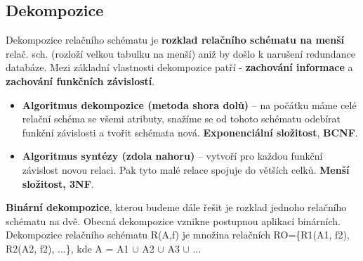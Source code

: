 \subsection{Dekompozice}
Dekompozice relačního schématu je \textbf{rozklad relačního schématu na menší} relač. sch. (rozloží velkou tabulku na menší) aniž by došlo k narušení redundance databáze. Mezi základní vlastnosti dekompozice patří - \textbf{zachování informace} a \textbf{zachování funkčních závislostí}.
\begin{itemize}
\item \textbf{Algoritmus dekompozice (metoda shora dolů)} -- na počátku máme celé relační schéma se všemi atributy, snažíme se od tohoto schématu odebírat funkční závislosti a tvořit schémata nová. \textbf{Exponenciální složitost}, \textbf{BCNF}.
\item \textbf{Algoritmus syntézy (zdola nahoru)} -- vytvoří pro každou funkční závislost novou relaci. Pak tyto malé relace spojuje do větších celků. \textbf{Menší složitost, 3NF}.
\end{itemize}
\textbf{Binární dekompozice}, kterou budeme dále řešit je rozklad jednoho relačního schématu na dvě. Obecná dekompozice vznikne postupnou aplikací binárních. Dekompozice relačního schématu R(A,f) je množina relačních RO=\{R1(A1, f2), R2(A2, f2), ...\}, kde A = A1 $\cup$ A2 $\cup$ A3 $\cup$ ...

